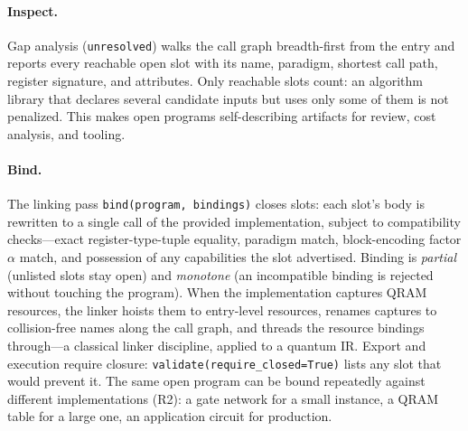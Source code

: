 \paragraph{Inspect.}
Gap analysis (\texttt{unresolved}) walks the call graph breadth-first from
the entry and reports every reachable open slot with its name, paradigm,
shortest call path, register signature, and attributes.  Only reachable
slots count: an algorithm library that declares several candidate inputs but
uses only some of them is not penalized.  This makes open programs
self-describing artifacts for review, cost analysis, and tooling.

\paragraph{Bind.}
The linking pass \texttt{bind(program, bindings)} closes slots: each slot's
body is rewritten to a single call of the provided implementation, subject to
compatibility checks---exact register-type-tuple equality, paradigm match,
block-encoding factor $\alpha$ match, and possession of any capabilities the
slot advertised.  Binding is \emph{partial} (unlisted slots stay open) and
\emph{monotone} (an incompatible binding is rejected without touching the
program).  When the implementation captures QRAM resources, the linker
hoists them to entry-level resources, renames captures to collision-free
names along the call graph, and threads the resource bindings through---a
classical linker discipline, applied to a quantum IR.  Export and execution
require closure: \texttt{validate(require\_closed=True)} lists any slot that
would prevent it.  The same open program can be bound repeatedly against
different implementations (R2): a gate network for a small instance, a QRAM
table for a large one, an application circuit for production.

